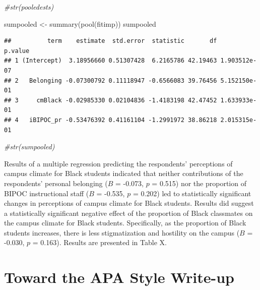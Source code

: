 \documentclass[
]{book}
\newenvironment{Shaded}{\begin{snugshade}}{\end{snugshade}}
\newcommand{\CommentTok}[1]{\textcolor[rgb]{0.56,0.35,0.01}{\textit{#1}}}
\newcommand{\FunctionTok}[1]{\textcolor[rgb]{0.00,0.00,0.00}{#1}}
\newcommand{\NormalTok}[1]{#1}
\newcommand{\OtherTok}[1]{\textcolor[rgb]{0.56,0.35,0.01}{#1}}
\begin{document}
\begin{Shaded}
\begin{Highlighting}[]
\CommentTok{\#str(pooledests)}
\end{Highlighting}
\end{Shaded}

\begin{Shaded}
\begin{Highlighting}[]
\NormalTok{sumpooled }\OtherTok{\textless{}{-}} \FunctionTok{summary}\NormalTok{(}\FunctionTok{pool}\NormalTok{(fitimp))}
\NormalTok{sumpooled}
\end{Highlighting}
\end{Shaded}

\begin{verbatim}
##          term    estimate  std.error  statistic       df      p.value
## 1 (Intercept)  3.18956660 0.51307428  6.2165786 42.19463 1.903512e-07
## 2   Belonging -0.07300792 0.11118947 -0.6566083 39.76456 5.152150e-01
## 3     cmBlack -0.02985330 0.02104836 -1.4183198 42.47452 1.633933e-01
## 4   iBIPOC_pr -0.53476392 0.41161104 -1.2991972 38.86218 2.015315e-01
\end{verbatim}

\begin{Shaded}
\begin{Highlighting}[]
\CommentTok{\#str(sumpooled)}
\end{Highlighting}
\end{Shaded}

Results of a multiple regression predicting the respondents' perceptions of campus climate for Black students indicated that neither contributions of the respondents' personal belonging (\(B\) = -0.073, \(p\) = 0.515) nor the proportion of BIPOC instructional staff (\(B\) = -0.535, \(p\) = 0.202) led to statistically significant changes in perceptions of campus climate for Black students. Results did suggest a statistically significant negative effect of the proportion of Black classmates on the campus climate for Black students. Specifically, as the proportion of Black students increases, there is less stigmatization and hostility on the campus (\(B\) = -0.030, \(p\) = 0.163). Results are presented in Table X.

\hypertarget{toward-the-apa-style-write-up-1}{%
\section{Toward the APA Style Write-up}\label{toward-the-apa-style-write-up-1}}
\end{document}
